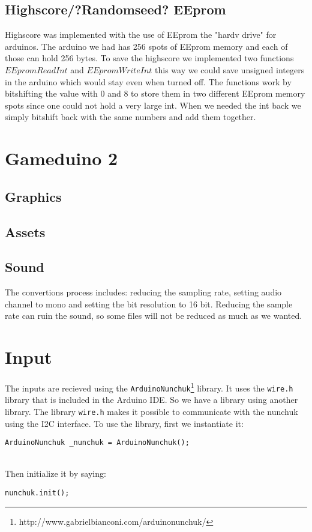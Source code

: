 \subsection{Highscore/?Randomseed? EEprom}
Highscore was implemented with the use of EEprom the "hardv drive" for arduinos. The arduino we had has 256 spots of EEprom memory and each of those can hold 256 bytes. To save the highscore we implemented two functions $EEpromReadInt$ and $EEpromWriteInt$ this way we could save unsigned integers in the arduino which would stay even when turned off. The functions work by bitshifting the value with 0 and 8 to store them in two different EEprom memory spots since one could not hold a very large int. When we needed the int back we simply bitshift back with the same numbers and add them together.



\section{Gameduino 2}
\subsection{Graphics}
\subsection{Assets}
\subsection{Sound}
The convertions process includes: reducing the sampling rate, setting audio channel to mono and setting
the bit resolution to 16 bit. Reducing the sample rate can ruin the sound, so some files
will not be reduced as much as we wanted.


\section{Input}
The inputs are recieved using the {\tt ArduinoNunchuk}\footnote{http://www.gabrielbianconi.com/arduinonunchuk/} library.
It uses the {\tt wire.h} library that is included in the Arduino IDE. So we have a library using another library.
The library {\tt wire.h} makes it possible to communicate with the
nunchuk using the I2C interface. To use the library, first we instantiate it: \\
\centerline{{\tt ArduinoNunchuk \_nunchuk = ArduinoNunchuk();}}\\ Then initialize it by saying: \\ \centerline{{\tt nunchuk.init();}}

